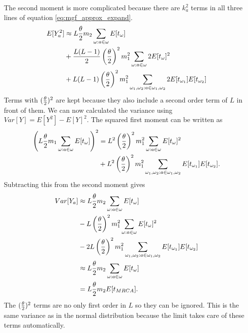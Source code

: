 The second moment is more complicated because there are $k_a^2$ terms in all
three lines of equation \ref{eq:mgf_approx_expand}.
\begin{align}
  E[Y_a^2] &\approx L\frac{\theta}{2} m_2 \sum_{\omega : a \in \omega} E[t_\omega] \nonumber \\
  &+ \frac{L(L-1)}{2} \left(\frac{\theta}{2} \right)^2 m_1^2 \sum_{\omega : a \in \omega} 2 E[t_\omega]^2 \nonumber \\
  &+ L(L-1) \left(\frac{\theta}{2} \right)^2 m_1^2 \sum_{\omega_1 , \omega_2: a \in \omega_1 , \omega_2} 2 E[t_{\omega_1}]E[t_{\omega_2}]
\end{align}
Terms with $(\frac{\theta}{2})^2$ are kept because they also include a second order term of
$L$ in front of them. We can now calculated the variance using $Var[Y]=E[Y^2] -
E[Y]^2$. The squared first moment can be written as
\begin{align}
  \left(L\frac{\theta}{2} m_1 \sum_{\omega : a \in \omega} E[t_\omega] \right)^2 &=
  L^2\left(\frac{\theta}{2}\right)^2 m_1^2 \sum_{\omega : a \in \omega} E[t_\omega]^2 \nonumber \\
  &+ L^2\left(\frac{\theta}{2}\right)^2 m_1^2 \sum_{\omega_1 , \omega_2: a \in \omega_1 , \omega_2} E[t_{\omega_1}]E[t_{\omega_2}].
\end{align}
Subtracting this from the second moment gives
\begin{align}
  Var[Y_a] &\approx L\frac{\theta}{2} m_2 \sum_{\omega : a \in \omega} E[t_\omega] \nonumber \\
  &- L \left(\frac{\theta}{2}\right)^2 m_1^2 \sum_{\omega : a \in \omega}E[t_\omega]^2 \nonumber \\
  &-  2L \left(\frac{\theta}{2}\right)^2 m_1^2 \sum_{\omega_1 , \omega_2: a \in \omega_1 , \omega_2} E[t_{\omega_1}]E[t_{\omega_2}] \nonumber \\
  &\approx L\frac{\theta}{2} m_2 \sum_{\omega : a \in \omega} E[t_\omega] \nonumber \\
  &= L\frac{\theta}{2} m_2 E[t_{MRCA}].
\end{align}
The $(\frac{\theta}{2})^2$ terms are no only first order in $L$ so they can be ignored. This
is the same variance as in the normal distribution because the limit takes care
of these terms automatically.
